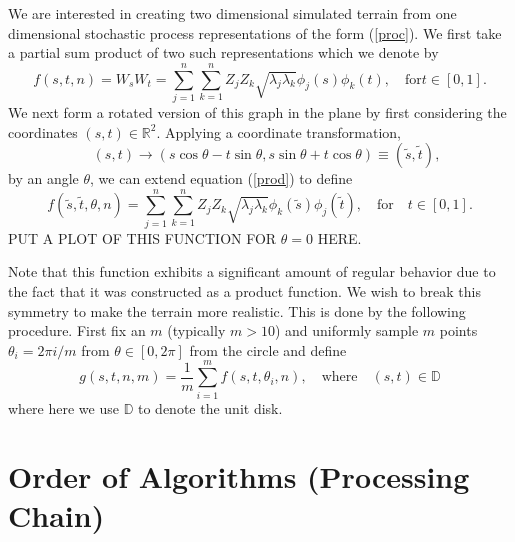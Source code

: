 \documentclass{amsart}
\begin{document}
We are interested in creating two dimensional simulated terrain from one 
dimensional stochastic process representations of the form (\ref{proc}).
We first take a partial sum product of two such representations which we denote by
%
\begin{equation}
    f(s,t,n) = W_s W_t = \sum_{j=1}^n\sum_{k=1}^n Z_j Z_k \sqrt{\lambda_j\lambda_k}
    \phi_j(s)\phi_k(t),\quad\mathrm{for} t\in[0,1].\label{prod}
\end{equation}
%
We next form a rotated version of this graph in the plane by first considering 
the coordinates $(s,t)\in\mathbb{R}^2$. Applying a coordinate transformation,
%
\begin{equation}
\quad (s,t) \rightarrow (s\cos\theta - t\sin\theta, s\sin\theta + t\cos\theta)
\equiv (\tilde s, \tilde t),
\end{equation}
%
by an angle $\theta$, we can extend equation (\ref{prod}) to define
%
\begin{equation}
f(\tilde s,\tilde t,\theta,n) = \sum_{j=1}^n\sum_{k=1}^n Z_j Z_k \sqrt{\lambda_j\lambda_k}
\phi_k(\tilde s)\phi_j(\tilde t),\quad\mathrm{for}\quad t\in[0,1].
\end{equation}
%
PUT A PLOT OF THIS FUNCTION FOR $\theta = 0$ HERE.

Note that this function exhibits a significant amount of regular 
behavior due to the fact that it was constructed as a product function.
We wish to break this symmetry to make the terrain more realistic.  This is 
done by the following procedure.  First fix an $m$ (typically $m>10$) and 
uniformly sample $m$ points $\theta_i = 2\pi i/m$ from $\theta\in[0,2\pi]$ from the 
circle and define 
%
\begin{equation}
    g(s,t,n,m) = \frac{1}{m}\sum_{i=1}^m f(s,t,\theta_i,n), \quad\mathrm{where}
    \quad (s,t)\in\mathbb{D}
\end{equation}
%
where here we use $\mathbb{D}$ to denote the unit disk.

\section{Order of Algorithms (Processing Chain)}
\end{document}
